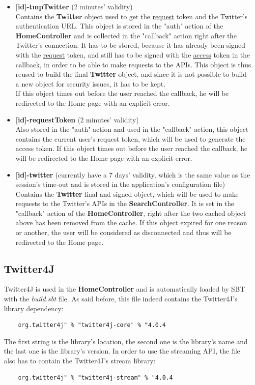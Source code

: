 \documentclass[a4paper,11pt]{report}
\begin{document}
\begin{itemize}
	\item \textbf{[id]-tmpTwitter} (2 minutes' validity)\\
	Contains the \textbf{Twitter} object used to get the \underline{request} token and the Twitter's authentication URL. This object is stored in the "auth" action of the \textbf{HomeController} and is collected in the "callback" action right after the Twitter's connection. It has to be stored, because it has already been signed with the \underline{request} token, and still has to be signed with the \underline{access} token in the callback, in order to be able to make requests to the APIs. This object is thus reused to build the final \textbf{Twitter} object, and since it is not possible to build a new object for security issues, it has to be kept.\\
	If this object times out before the user reached the callback, he will be redirected to the Home page with an explicit error.
	\item \textbf{[id]-requestToken} (2 minutes' validity)\\
	Also stored in the "auth" action and used in the "callback" action, this object contains the current user's request token, which will be used to generate the access token. If this object times out before the user reached the callback, he will be redirected to the Home page with an explicit error.
	\item \textbf{[id]-twitter} (currently have a 7 days' validity, which is the same value as the session's time-out and is stored in the application's configuration file)\\
	Contains the \textbf{Twitter} final and signed object, which will be used to make requests to the Twitter's APIs in the \textbf{SearchController}. It is set in the "callback" action of the \textbf{HomeController}, right after the two cached object above has been removed from the cache. If this object expired for one reason or another, the user will be considered as disconnected and thus will be redirected to the Home page.
\end{itemize}

\subsection{Twitter4J}
Twitter4J is used in the \textbf{HomeController} and is automatically loaded by SBT with the \emph{build.sbt} file. As said before, this file indeed contains the Twitter4J's library dependency:
\begin{lstlisting}
	org.twitter4j" % "twitter4j-core" % "4.0.4
\end{lstlisting}
The first string is the library's location, the second one is the library's name and the last one is the library's version. In order to use the streaming API, the file also has to contain the Twitter4J's stream library: 
\begin{lstlisting}
	org.twitter4j" % "twitter4j-stream" % "4.0.4
\end{lstlisting}
\end{document}

